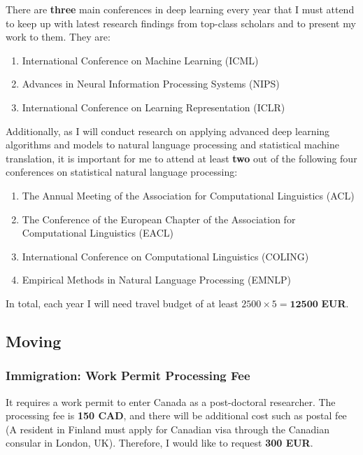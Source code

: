 \documentclass[11pt, oneside]{essay}
\begin{document}
There are \textbf{three} main conferences in deep learning every
year that I must attend to keep up with latest research findings
from top-class scholars and to present my work to them. They are:
\begin{enumerate}
    \item International Conference on Machine Learning (ICML)
    \item Advances in Neural Information Processing Systems (NIPS)
    \item International Conference on Learning Representation (ICLR)
\end{enumerate}

Additionally, as I will conduct research on applying advanced
deep learning algorithms and models to natural language
processing and statistical machine translation, it is important
for me to attend at least \textbf{two} out of the following four
conferences on statistical natural language processing:
\begin{enumerate}
    \item The Annual Meeting of the Association for Computational Linguistics (ACL)
    \item The Conference of the European Chapter of the
    Association for Computational Linguistics (EACL)
    \item International Conference on Computational Linguistics (COLING)
    \item Empirical Methods in Natural Language Processing (EMNLP)
\end{enumerate}

In total, each year I will need travel budget of at least $2500
\times 5 = \mathbf{12500}$ \textbf{EUR}.

\subsection{Moving}

\subsubsection{Immigration: Work Permit Processing Fee}

It requires a work permit to enter Canada as a post-doctoral
researcher. The processing fee is \textbf{150 CAD}, and
there will be additional cost such as postal fee (A
resident in Finland must apply for Canadian visa through the
Canadian consular in London, UK). Therefore, I would like to
request \textbf{300 EUR}.
\end{document}
